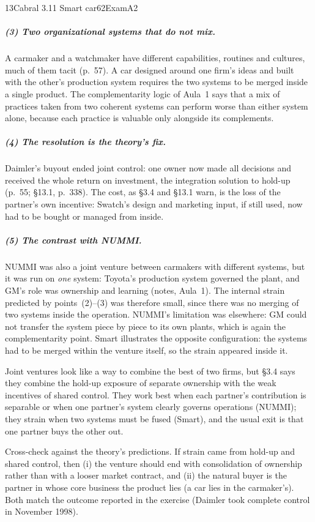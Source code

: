 \begin{exsol}{13}{Cabral 3.11 Smart car}{62}{Exam}{A2}
\subparagraph{(3) Two organizational systems that do not mix.} A carmaker and a watchmaker have
different capabilities, routines and cultures, much of them tacit (p.~57). A car designed around
one firm's ideas and built with the other's production system requires the two systems to be
merged inside a single product. The complementarity logic of Aula~1 says that a mix of practices
taken from two coherent systems can perform worse than either system alone, because each
practice is valuable only alongside its complements.

\subparagraph{(4) The resolution is the theory's fix.} Daimler's buyout ended joint control:
one owner now made all decisions and received the whole return on investment, the
integration solution to hold-up (p.~55; \S13.1, p.~338). The cost, as \S3.4 and \S13.1 warn, is
the loss of the partner's own incentive: Swatch's design and marketing input, if still used,
now had to be bought or managed from inside.

\subparagraph{(5) The contrast with NUMMI.} NUMMI was also a joint venture between carmakers
with different systems, but it was run on \emph{one} system: Toyota's production system governed
the plant, and GM's role was ownership and learning (notes, Aula~1). The internal strain
predicted by points~(2)--(3) was therefore small, since there was no merging of two systems
inside the operation. NUMMI's limitation was elsewhere: GM could not transfer the system
piece by piece to its own plants, which is again the complementarity point. Smart illustrates
the opposite configuration: the systems had to be merged within the venture itself, so the
strain appeared inside it.

\interp Joint ventures look like a way to combine the best of two firms, but \S3.4 says they
combine the hold-up exposure of separate ownership with the weak incentives of shared control.
They work best when each partner's contribution is separable or when one partner's system
clearly governs operations (NUMMI); they strain when two systems must be fused (Smart), and
the usual exit is that one partner buys the other out.

\verify Cross-check against the theory's predictions. If strain came from hold-up and shared
control, then (i) the venture should end with consolidation of ownership rather than with a
looser market contract, and (ii) the natural buyer is the partner in whose core business the
product lies (a car lies in the carmaker's). Both match the outcome reported in the exercise
(Daimler took complete control in November 1998).

\end{exsol}
